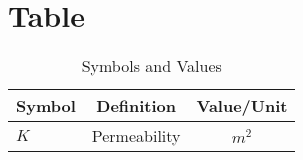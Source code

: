 \chapter{Table}


\begin{table}
	\centering
	\caption{Symbols and Values}
	\label{tab:append_Symbols_Values}
	\begin{tabular}{lcc}
		\toprule
		Symbol & Definition & Value/Unit\tabularnewline
		\midrule
		$K$ & Permeability & $m^2$\\
		\bottomrule
	\end{tabular}
\end{table}

